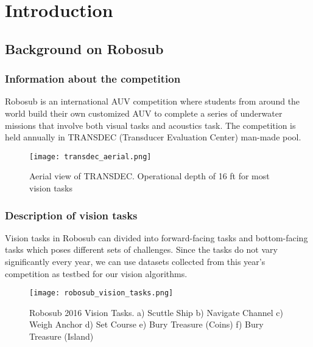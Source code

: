 \chapter{Introduction}

\section{Background on Robosub}

\subsection{Information about the competition}
Robosub is an international AUV competition where students from around the world build their own customized AUV to complete a series of underwater missions that involve both visual tasks and acoustics task. The competition is held annually in TRANSDEC (Transducer Evaluation Center) man-made pool.

\begin{figure}[ht]
\centering

        \texttt{[image: transdec\_aerial.png]}
        \caption{Aerial view of TRANSDEC. Operational depth of 16 ft for most vision tasks}
        \label{fig:transdec_aerial}

\end{figure}

\subsection{Description of vision tasks}
Vision tasks in Robosub can divided into forward-facing tasks and bottom-facing tasks which poses different sets of challenges. Since the tasks do not vary significantly every year, we can use datasets collected from this year's competition as testbed for our vision algorithms.

\begin{figure}[ht]
\centering

        \texttt{[image: robosub\_vision\_tasks.png]}
        \caption{Robosub 2016 Vision Tasks. a) Scuttle Ship b) Navigate Channel c) Weigh Anchor d) Set Course e) Bury Treasure (Coins) f) Bury Treasure (Island)}
        \label{fig:robosub2016_tasks}

\end{figure}

